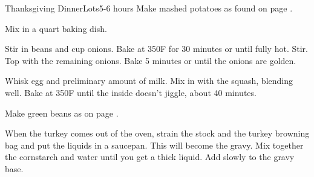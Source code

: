 \documentclass[../Cookbook.tex]{subfiles}
\begin{document}
\begin{recipe}{Thanksgiving Dinner}{Lots}{5-6 hours}
\newstep
Make mashed potatoes as found on page \pageref{MashedPotatoes}.

Mix in a  quart baking dish.

Stir in beans and  cup onions. Bake at 350\0F for 30 minutes or until fully hot. Stir.\\
Top with the remaining onions. Bake 5 minutes or until the onions are golden.

Whisk egg and preliminary amount of milk.
Mix in with the squash, blending well.
Bake at 350\0F until the inside doesn't jiggle, about 40%
minutes.

\newstep
Make green beans as on page \pageref{CreamBeans}.

When the turkey comes out of the oven, strain the stock and the turkey browning bag and put the liquids in a saucepan. This will become the gravy. Mix together the cornstarch and water until you get a thick liquid. Add slowly to the gravy base.

\end{recipe}
\end{document}
